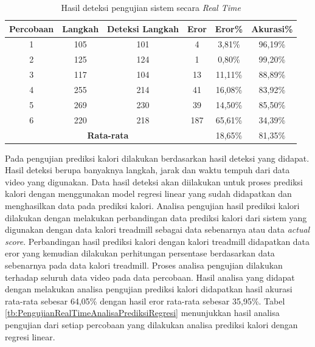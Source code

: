 \begin{longtable}{|c|c|c|c|c|c|}
  \caption{Hasil deteksi pengujian sistem secara \emph{Real Time}}
  \label{tb:PengujianRealTimeAnalisaDeteksi}                                   \\
  \hline
  \rowcolor[HTML]{C0C0C0}
  \textbf{Percobaan} & \textbf{Langkah} & \textbf{Deteksi Langkah} & \textbf{Eror} & \textbf{Eror\%} & \textbf{Akurasi\%} \\
  \hline
  1   & 105   & 101 & 4    & 3,81\%     & 96,19\%   \\
  \hline
  2   & 125   & 124 & 1    & 0,80\%     & 99,20\%   \\
  \hline
  3   & 117   & 104 & 13   & 11,11\%    & 88,89\%     \\
  \hline
  4   & 255   & 214 & 41   & 16,08\%    & 83,92\%   \\
  \hline
  5   & 269   & 230 & 39   & 14,50\%    & 85,50\%   \\
  \hline
  6   & 220   & 218 & 187  & 65,61\%    & 34,39\%   \\
  \hline

  \multicolumn{4}{|c|}{\textbf{Rata-rata}} & 18,65\% & 81,35\% \\
  \hline
\end{longtable}

Pada pengujian prediksi kalori dilakukan berdasarkan hasil deteksi yang didapat. Hasil deteksi berupa banyaknya langkah, jarak dan waktu tempuh dari data video yang digunakan. Data hasil deteksi akan diilakukan untuk proses prediksi kalori dengan menggunakan model regresi linear yang sudah didapatkan dan menghasilkan data pada prediksi kalori. Analisa pengujian hasil prediksi kalori dilakukan dengan melakukan perbandingan data prediksi kalori dari sistem yang digunakan dengan data kalori treadmill sebagai data sebenarnya atau data \emph{actual score}. Perbandingan hasil prediksi kalori dengan kalori treadmill didapatkan data eror yang kemudian dilakukan perhitungan persentase berdasarkan data sebenarnya pada data kalori treadmill. Proses analisa pengujian dilakukan terhadap seluruh data video pada data percobaan. Hasil analisa yang didapat dengan melakukan analisa pengujian prediksi kalori didapatkan hasil akurasi rata-rata sebesar 64,05\% dengan hasil eror rata-rata sebesar 35,95\%. Tabel \ref{tb:PengujianRealTimeAnalisaPrediksiRegresi} menunjukkan hasil analisa pengujian dari setiap percobaan yang dilakukan analisa prediksi kalori dengan regresi linear.

